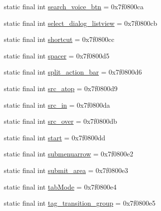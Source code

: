\begin{DoxyCompactItemize}
\item 
static final int \mbox{\hyperlink{classandroid_1_1support_1_1v7_1_1appcompat_1_1_r_1_1id_a7d142ddff5b4fc44eccc940e9637cc13}{search\+\_\+voice\+\_\+btn}} = 0x7f0800ca
\item 
static final int \mbox{\hyperlink{classandroid_1_1support_1_1v7_1_1appcompat_1_1_r_1_1id_a770539389d1ac0acea54ed3fa5bd4678}{select\+\_\+dialog\+\_\+listview}} = 0x7f0800cb
\item 
static final int \mbox{\hyperlink{classandroid_1_1support_1_1v7_1_1appcompat_1_1_r_1_1id_a5e6c07eab32d329b1534a1746d1beb00}{shortcut}} = 0x7f0800cc
\item 
static final int \mbox{\hyperlink{classandroid_1_1support_1_1v7_1_1appcompat_1_1_r_1_1id_af3d077d30ddf6ee7ab53a8fd12b9066d}{spacer}} = 0x7f0800d5
\item 
static final int \mbox{\hyperlink{classandroid_1_1support_1_1v7_1_1appcompat_1_1_r_1_1id_a741149a72fc9b9aaf02b0346115459e2}{split\+\_\+action\+\_\+bar}} = 0x7f0800d6
\item 
static final int \mbox{\hyperlink{classandroid_1_1support_1_1v7_1_1appcompat_1_1_r_1_1id_ab3834f6ee23ff8baa7614ca68366bf1f}{src\+\_\+atop}} = 0x7f0800d9
\item 
static final int \mbox{\hyperlink{classandroid_1_1support_1_1v7_1_1appcompat_1_1_r_1_1id_a0302dbca2cbbbe0e6d36f6332939c370}{src\+\_\+in}} = 0x7f0800da
\item 
static final int \mbox{\hyperlink{classandroid_1_1support_1_1v7_1_1appcompat_1_1_r_1_1id_a8e4a43230fb4b6e5ccb4a6d151bfab22}{src\+\_\+over}} = 0x7f0800db
\item 
static final int \mbox{\hyperlink{classandroid_1_1support_1_1v7_1_1appcompat_1_1_r_1_1id_ac229029dd39474a212819b21d525af76}{start}} = 0x7f0800dd
\item 
static final int \mbox{\hyperlink{classandroid_1_1support_1_1v7_1_1appcompat_1_1_r_1_1id_a4af9872688d34e2e585113cf9f31968e}{submenuarrow}} = 0x7f0800e2
\item 
static final int \mbox{\hyperlink{classandroid_1_1support_1_1v7_1_1appcompat_1_1_r_1_1id_a3ba0b5cb29db70be085cc78170b1020e}{submit\+\_\+area}} = 0x7f0800e3
\item 
static final int \mbox{\hyperlink{classandroid_1_1support_1_1v7_1_1appcompat_1_1_r_1_1id_a9f4b211ddf6dcd1ba76c5031f318dfca}{tab\+Mode}} = 0x7f0800e4
\item 
static final int \mbox{\hyperlink{classandroid_1_1support_1_1v7_1_1appcompat_1_1_r_1_1id_ab05db4df9a1936b8c66bba8d63da15a4}{tag\+\_\+transition\+\_\+group}} = 0x7f0800e5

\end{DoxyCompactItemize}
